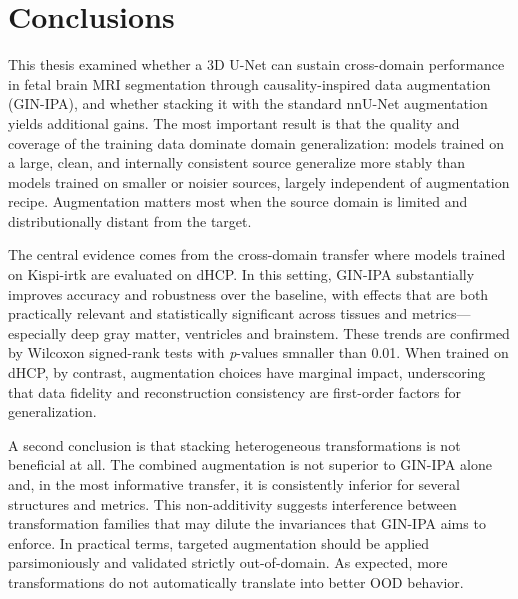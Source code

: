 
\chapter*{Conclusions}
\vspace{1cm}

This thesis examined whether a 3D U-Net can sustain cross-domain performance in fetal brain MRI segmentation through causality-inspired data augmentation (GIN-IPA), and whether stacking it with the standard nnU-Net augmentation yields additional gains. The most important result is that the quality and coverage of the training data dominate domain generalization: models trained on a large, clean, and internally consistent source generalize more stably than models trained on smaller or noisier sources, largely independent of augmentation recipe. Augmentation matters most when the source domain is limited and distributionally distant from the target.

The central evidence comes from the cross-domain transfer where models trained on Kispi-irtk are evaluated on dHCP. In this setting, GIN-IPA substantially improves accuracy and robustness over the baseline, with effects that are both practically relevant and statistically significant across tissues and metrics---especially deep gray matter, ventricles and brainstem. These trends are confirmed by Wilcoxon signed-rank tests with \textit{p}-values smnaller than \num{0.01}. When trained on dHCP, by contrast, augmentation choices have marginal impact, underscoring that data fidelity and reconstruction consistency are first-order factors for generalization.

A second conclusion is that stacking heterogeneous transformations is not beneficial at all. The combined augmentation is not superior to GIN-IPA alone and, in the most informative transfer, it is consistently inferior for several structures and metrics. This non-additivity suggests interference between transformation families that may dilute the invariances that GIN-IPA aims to enforce. In practical terms, targeted augmentation should be applied parsimoniously and validated strictly out-of-domain. As expected, more transformations do not automatically translate into better OOD behavior.


